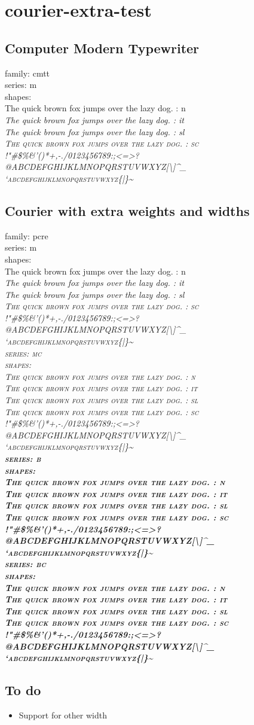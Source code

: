 \documentclass{article}
\makeatletter
\newcommand{\quickbrownfox}{%
\textparagraph{} The quick brown fox jumps over the lazy dog.}
\newcommand{\ascii}{ !"\#\$\%\&'()*+,-./0123456789:;<=>?\\
@ABCDEFGHIJKLMNOPQRSTUVWXYZ[\textbackslash{}]\textasciicircum{}\_\\
`abcdefghijklmnopqrstuvwxyz\{|\}\textasciitilde{}}
\newcommand{\shapes}{%
\bgroup
\upshape\quickbrownfox{} : n \\
\itshape\selectfont\quickbrownfox{} : it \\
\slshape\selectfont\quickbrownfox{} : sl \\
\scshape\selectfont\quickbrownfox{} : sc \\
\noindent\ascii \\
\egroup}
\makeatother
\begin{document}
\section{courier-extra-test}

\subsection{Computer Modern Typewriter}

\normalfont
{}\selectfont
family: cmtt \\
series: m \\
shapes: \\
\shapes
\normalfont

\subsection{Courier with extra weights and widths}

\normalfont
{}\selectfont
family: pcre \\
%
\mdseries
series: m \\
shapes: \\
\shapes
%
\selectfont
series: mc \\
shapes: \\
\shapes
%
\bfseries
series: b \\
shapes: \\
\shapes
%
\selectfont
series: bc \\
shapes: \\
\shapes
\normalfont

\subsection{To do}
\begin{itemize}
  \item Support for other width
\end{itemize}
\end{document}
